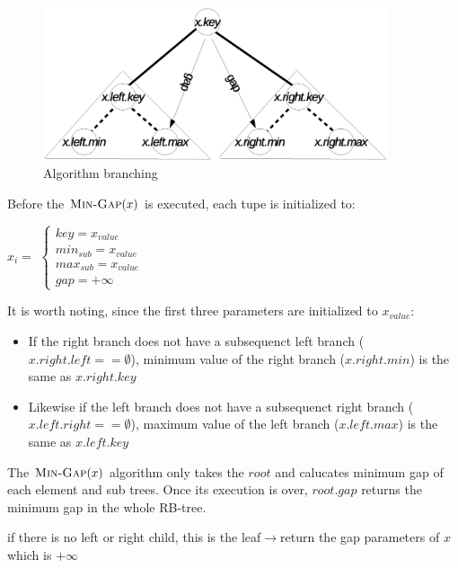 \documentclass[11pt]{article}
\begin{document}
\begin{enumerate}
    \begin{figure}[h!]
		\centerline{\includegraphics[width=4in]{prob-14-3-6.eps}}
		\caption{Algorithm branching}
		\label{fig:prob-14-3-6}
	\end{figure}

  	Before the $\textnormal{\scshape Min-Gap}(x)$ is executed, each tupe is initialized to:

	\hspace{10mm} $x_i= $
	\begin{math}
		\left\{
    		\begin{array}{l}
      			key = x_{value}\\
      			min_{sub} = x_{value}\\
      			max_{sub} = x_{value}\\
      			gap = +\infty
    		\end{array}
  		\right.
	\end{math}
	
	It is worth noting, since the first three parameters are initialized to $x_{value}$: 
	
	\begin{itemize}
		\item If the right branch does not have a subsequenct left branch ($x.right.left==\emptyset$), minimum value of the right branch ($x.right.min$) is the same as $x.right.key$
		\item Likewise if the left branch does not have a subsequenct right branch ($x.left.right==\emptyset$), maximum value of the left branch ($x.left.max$) is the same as $x.left.key$

	\end{itemize}
	
	The $\textnormal{\scshape Min-Gap}(x)$ algorithm only takes the $root$ and calucates minimum gap of each element and sub trees. Once its execution is over, $root.gap$ returns the minimum gap in the whole RB-tree.
	

	\begin{codebox}
		
		\li \Comment if there is no left or right child, this is the leaf$\rightarrow$return the gap parameters of $x$ which is $+\infty$ 


\end{codebox}
\end{enumerate}
\end{document}
